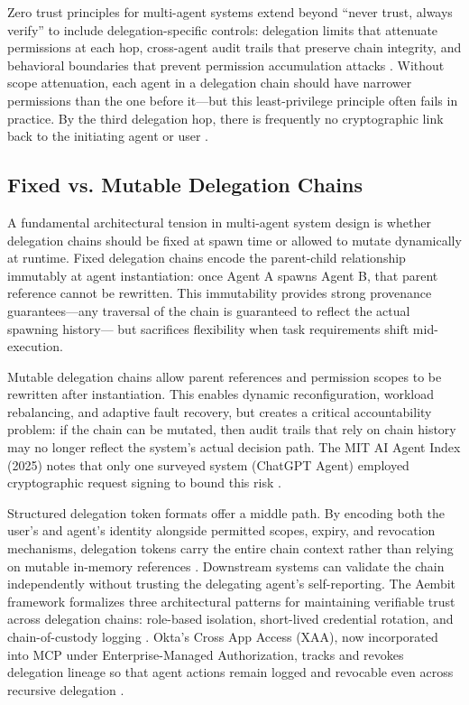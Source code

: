 Zero trust principles for multi-agent systems extend beyond ``never trust, always verify'' to include delegation-specific controls: delegation limits that attenuate permissions at each hop, cross-agent audit trails that preserve chain integrity, and behavioral boundaries that prevent permission accumulation attacks \cite{gupta_zero_trust_2025, cloudsecurityalliance_delegation_2025}. Without scope attenuation, each agent in a delegation chain should have narrower permissions than the one before it—but this least-privilege principle often fails in practice. By the third delegation hop, there is frequently no cryptographic link back to the initiating agent or user \cite{cloudsecurityalliance_delegation_2025}.

\subsection{Fixed vs. Mutable Delegation Chains}

A fundamental architectural tension in multi-agent system design is whether delegation chains should be fixed at spawn time or allowed to mutate dynamically at runtime. Fixed delegation chains encode the parent-child relationship immutably at agent instantiation: once Agent A spawns Agent B, that parent reference cannot be rewritten. This immutability provides strong provenance guarantees—any traversal of the chain is guaranteed to reflect the actual spawning history— but sacrifices flexibility when task requirements shift mid-execution.

Mutable delegation chains allow parent references and permission scopes to be rewritten after instantiation. This enables dynamic reconfiguration, workload rebalancing, and adaptive fault recovery, but creates a critical accountability problem: if the chain can be mutated, then audit trails that rely on chain history may no longer reflect the system's actual decision path. The MIT AI Agent Index (2025) notes that only one surveyed system (ChatGPT Agent) employed cryptographic request signing to bound this risk \cite{zylos_accountability_2026}.

Structured delegation token formats offer a middle path. By encoding both the user's and agent's identity alongside permitted scopes, expiry, and revocation mechanisms, delegation tokens carry the entire chain context rather than relying on mutable in-memory references \cite{scalekit_delegation_2025, aembit_agent_architectures_2025}. Downstream systems can validate the chain independently without trusting the delegating agent's self-reporting. The Aembit framework formalizes three architectural patterns for maintaining verifiable trust across delegation chains: role-based isolation, short-lived credential rotation, and chain-of-custody logging \cite{aembit_agent_architectures_2025}. Okta's Cross App Access (XAA), now incorporated into MCP under Enterprise-Managed Authorization, tracks and revokes delegation lineage so that agent actions remain logged and revocable even across recursive delegation \cite{cloudsecurityalliance_delegation_2025}.

